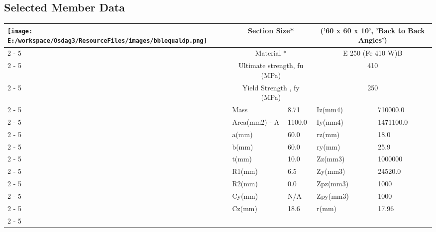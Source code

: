 \documentclass{article}%
\begin{document}
\subsection{Selected Member Data}%
\label{subsec:SelectedMemberData}%
\renewcommand{\arraystretch}{1.2}%
\begin{longtable}{|p{5cm}|p{2cm}|p{2cm}|p{2cm}|p{5cm}|}%
\hline%
\hline%
\multirow{13}{*}{\texttt{[image: E:/workspace/Osdag3/ResourceFiles/images/bblequaldp.png]}}&\multicolumn{2}{|c|}{Section Size*}&\multicolumn{2}{|c|}{('60 x 60 x 10', 'Back to Back Angles')}\\%
\cline{2%
-%
5}%
&\multicolumn{2}{|c|}{Material *}&\multicolumn{2}{|c|}{E 250 (Fe 410 W)B}\\%
\cline{2%
-%
5}%
&\multicolumn{2}{|c|}{Ultimate strength, fu (MPa)}&\multicolumn{2}{|c|}{410}\\%
\cline{2%
-%
5}%
&\multicolumn{2}{|c|}{Yield Strength , fy (MPa)}&\multicolumn{2}{|c|}{250}\\%
\cline{2%
-%
5}%
&Mass&8.71&Iz(mm4)&710000.0\\%
\cline{2%
-%
5}%
&Area(mm2) {-} A&1100.0&Iy(mm4)&1471100.0\\%
\cline{2%
-%
5}%
&a(mm)&60.0&rz(mm)&18.0\\%
\cline{2%
-%
5}%
&b(mm)&60.0&ry(mm)&25.9\\%
\cline{2%
-%
5}%
&t(mm)&10.0&Zz(mm3)&1000000\\%
\cline{2%
-%
5}%
&R1(mm)&6.5&Zy(mm3)&24520.0\\%
\cline{2%
-%
5}%
&R2(mm)&0.0&Zpz(mm3)&1000\\%
\cline{2%
-%
5}%
&Cy(mm)&N/A&Zpy(mm3)&1000\\%
\cline{2%
-%
5}%
&Cz(mm)&18.6&r(mm)&17.96\\%
\cline{2%
-%
5}%
\hline%
\end{longtable}

%
\newpage%
\end{document}

